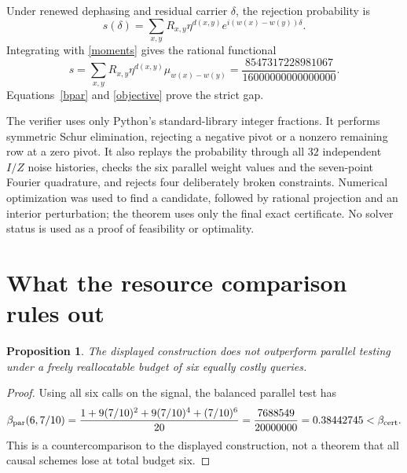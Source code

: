 \documentclass[11pt,a4paper]{article}
\newtheorem{proposition}{Proposition}
\begin{document}
Under renewed dephasing and residual carrier $\delta$, the rejection probability is
\[
 s(\delta)=\sum_{x,y}R_{x,y}\eta^{d(x,y)}
                  e^{i(w(x)-w(y))\delta}.
\]
Integrating with \eqref{moments} gives the rational functional
\begin{equation}\label{objective}
 s=\sum_{x,y}R_{x,y}\eta^{d(x,y)}\mu_{w(x)-w(y)}
   =\frac{8547317228981067}{16000000000000000}.
\end{equation}
Equations~\eqref{bpar} and \eqref{objective} prove the strict gap.

The verifier uses only Python's standard-library integer fractions. It performs symmetric Schur elimination, rejecting a negative pivot or a nonzero remaining row at a zero pivot. It also replays the probability through all $32$ independent $I/Z$ noise histories, checks the six parallel weight values and the seven-point Fourier quadrature, and rejects four deliberately broken constraints. Numerical optimization was used to find a candidate, followed by rational projection and an interior perturbation; the theorem uses only the final exact certificate. No solver status is used as a proof of feasibility or optimality.

\section{What the resource comparison rules out}
\begin{proposition}\label{cost}
The displayed construction does not outperform parallel testing under a freely reallocatable budget of six equally costly queries.
\end{proposition}
\begin{proof}
Using all six calls on the signal, the balanced parallel test has
\[
 \beta_{\rm par}(6,7/10)
 =\frac{1+9(7/10)^2+9(7/10)^4+(7/10)^6}{20}
 =\frac{7688549}{20000000}
 =0.38442745<\beta_{\rm cert}.
\]
This is a countercomparison to the displayed construction, not a theorem that all causal schemes lose at total budget six.
\end{proof}
\end{document}
